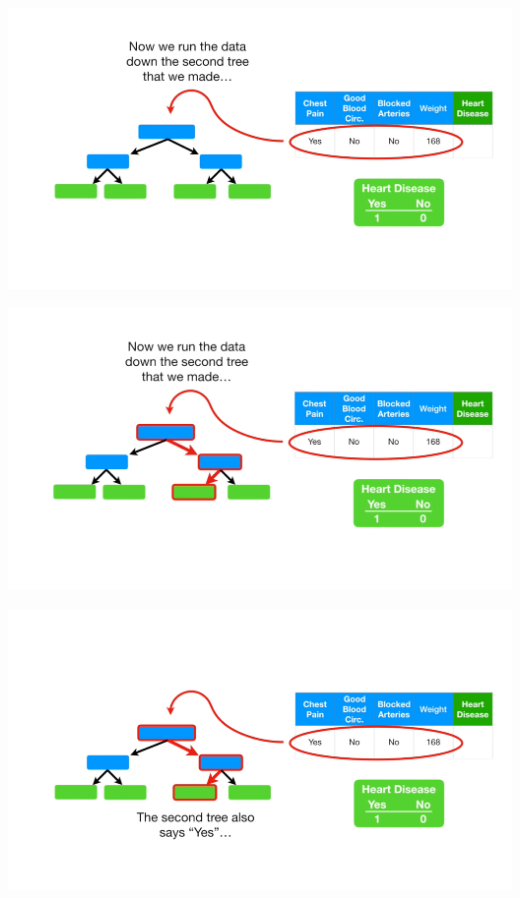 \documentclass[
  ignorenonframetext,
]{beamer}
\begin{document}
\begin{frame}{}
\protect\hypertarget{section-53}{}
\includegraphics{images/r54.png}
\end{frame}

\begin{frame}{}
\protect\hypertarget{section-54}{}
\includegraphics{images/r55.png}
\end{frame}

\begin{frame}{}
\protect\hypertarget{section-55}{}
\includegraphics{images/r56.png}
\end{frame}
\end{document}
